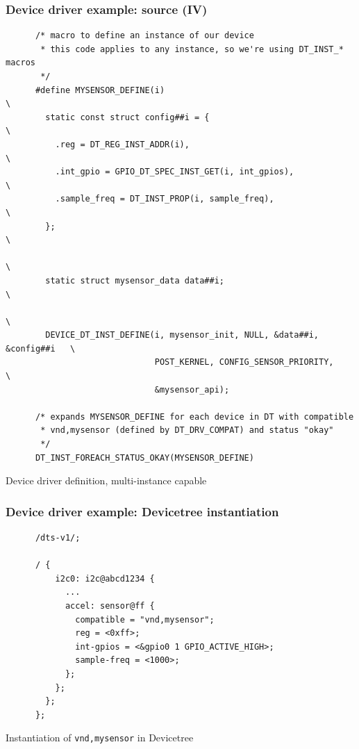 \documentclass[handout]{beamer}
\begin{document}
\begin{frame}[fragile]
  \frametitle{Device driver example: source (IV)}

  \begin{listing}[H]
    \begin{verbatim}
      /* macro to define an instance of our device
       * this code applies to any instance, so we're using DT_INST_* macros
       */
      #define MYSENSOR_DEFINE(i)                                             \
        static const struct config##i = {                                    \
          .reg = DT_REG_INST_ADDR(i),                                        \
          .int_gpio = GPIO_DT_SPEC_INST_GET(i, int_gpios),                   \
          .sample_freq = DT_INST_PROP(i, sample_freq),                       \
        };                                                                   \
                                                                             \
        static struct mysensor_data data##i;                                 \
                                                                             \
        DEVICE_DT_INST_DEFINE(i, mysensor_init, NULL, &data##i, &config##i   \
                              POST_KERNEL, CONFIG_SENSOR_PRIORITY,           \
                              &mysensor_api);

      /* expands MYSENSOR_DEFINE for each device in DT with compatible
       * vnd,mysensor (defined by DT_DRV_COMPAT) and status "okay"
       */
      DT_INST_FOREACH_STATUS_OKAY(MYSENSOR_DEFINE)
    \end{verbatim}
    \caption{Device driver definition, multi-instance capable}
  \end{listing}
\end{frame}

\begin{frame}[fragile]
  \frametitle{Device driver example: Devicetree instantiation}

  \begin{listing}[H]
    \begin{verbatim}
      /dts-v1/;

      / {
          i2c0: i2c@abcd1234 {
            ...
            accel: sensor@ff {
              compatible = "vnd,mysensor";
              reg = <0xff>;
              int-gpios = <&gpio0 1 GPIO_ACTIVE_HIGH>;
              sample-freq = <1000>;
            };
          };
        };
      };
    \end{verbatim}
    \caption{Instantiation of \texttt{vnd,mysensor} in Devicetree}
  \end{listing}
\end{frame}
\end{document}
